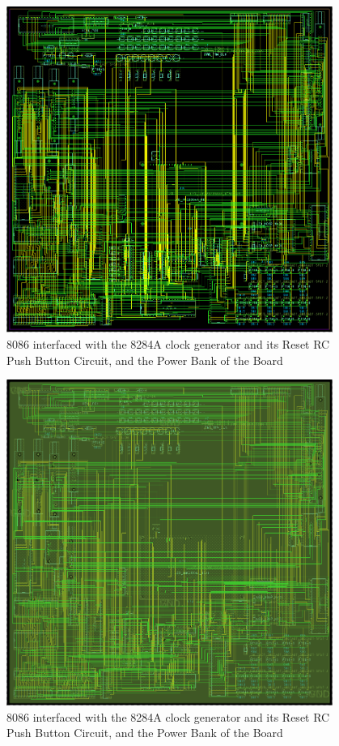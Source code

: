         \begin{figure}[ht]
            \begin{center}
                \includegraphics[width=0.95\textwidth]{figures/board.png}
                \caption{8086 interfaced with the 8284A clock generator and its Reset RC Push Button Circuit, and the Power Bank of the Board} \label{fig:board}
            \end{center}
        \end{figure}

        \begin{figure}[ht]
            \begin{center}
                \includegraphics[width=0.95\textwidth]{figures/all.png}
                \caption{8086 interfaced with the 8284A clock generator and its Reset RC Push Button Circuit, and the Power Bank of the Board} \label{fig:all}
            \end{center}
        \end{figure}

        \clearpage
